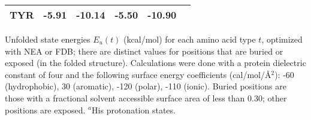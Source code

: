 \documentclass[a4paper,12pt]{article}
\begin{document}
\begin{table}[h]
\begin{center}
\begin{tabular}{cccccc}
TYR                    &  -5.91  &  -10.14  &   -5.50   &  -10.90  \\ \hline
\end{tabular}
\end{center}
{\footnotesize \noindent Unfolded state energies $E_u(t)$ (kcal/mol) for each amino acid type $t$, optimized with
NEA or FDB; there are distinct values for positions that are buried or exposed (in the folded structure). Calculations
were done with a protein dielectric constant of four and the following surface energy coefficients (cal/mol/\AA$^2$):
-60 (hydrophobic), 30 (aromatic), -120 (polar), -110 (ionic). Buried positions are those with a fractional solvent
accessible surface area of less than 0.30; other positions are exposed. $^a$His protonation states.
}
\end{table}
\end{document}

